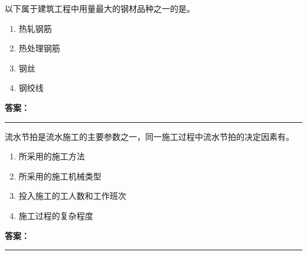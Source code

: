 \documentclass[UTF8,fontset=fandol,11pt]{ctexart}
\newcommand{\answerline}{\textcolor{answerred}{\rule{2.4cm}{0.7pt}}}
\begin{document}
\begin{quizbox}[title={乱序第 89 题｜第四章混凝土结构工程}]

以下属于建筑工程中用量最大的钢材品种之一的是。\\

\begin{enumerate}[label=\Alph*.]

\item 热轧钢筋

\item 热处理钢筋

\item 钢丝

\item 钢绞线

\end{enumerate}

\textbf{\textcolor{answerred}{答案：}} \answerline

\end{quizbox}

\vspace{0.2em}

\begin{quizbox}[title={乱序第 90 题｜第十章流水施工原理}]

流水节拍是流水施工的主要参数之一，同一施工过程中流水节拍的决定因素有。\\

\begin{enumerate}[label=\Alph*.]

\item 所采用的施工方法

\item 所采用的施工机械类型

\item 投入施工的工人数和工作班次

\item 施工过程的复杂程度

\end{enumerate}

\textbf{\textcolor{answerred}{答案：}} \answerline

\end{quizbox}

\vspace{0.2em}
\end{document}
